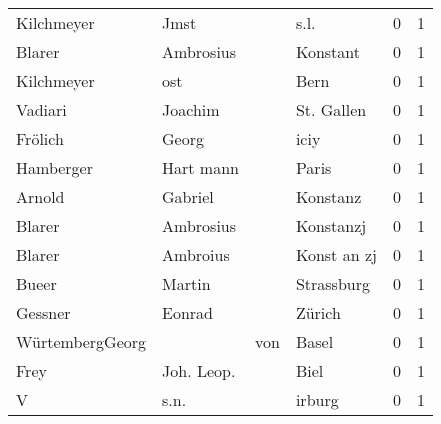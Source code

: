 \begin{center}
\begin{tiny}
\begin{longtabu}{llllrr}
               Kilchmeyer &                               Jmst &             &                                        s.l. &          0 &         1 \\
                   Blarer &                          Ambrosius &             &                                    Konstant &          0 &         1 \\
               Kilchmeyer &                                ost &             &                                        Bern &          0 &         1 \\
                  Vadiari &                            Joachim &             &                                  St. Gallen &          0 &         1 \\
                  Frölich &                              Georg &             &                                        iciy &          0 &         1 \\
                Hamberger &                          Hart mann &             &                                       Paris &          0 &         1 \\
                   Arnold &                            Gabriel &             &                                    Konstanz &          0 &         1 \\
                   Blarer &                          Ambrosius &             &                                   Konstanzj &          0 &         1 \\
                   Blarer &                           Ambroius &             &                                 Konst an zj &          0 &         1 \\
                    Bueer &                             Martin &             &                                  Strassburg &          0 &         1 \\
                  Gessner &                             Eonrad &             &                                      Zürich &          0 &         1 \\
          WürtembergGeorg &                                    &         von &                                       Basel &          0 &         1 \\
                     Frey &                         Joh. Leop. &             &                                        Biel &          0 &         1 \\
                        V &                               s.n. &             &                                      irburg &          0 &         1 \\

\end{longtabu}
\end{tiny}
\end{center}
